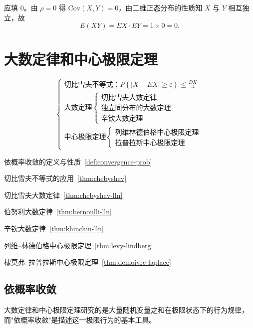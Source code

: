 \documentclass[lang=cn,11pt]{elegantbook}
\begin{document}
\begin{solution}
应填 0。由 \(\rho = 0\) 得 \(\mathrm{Cov}(X,Y) = 0\)，由二维正态分布的性质知 \(X\) 与 \(Y\) 相互独立，故
\[
E(XY) = EX \cdot EY = 1 \times 0 = 0.
\]
\end{solution}




\chapter{大数定律和中心极限定理}

\[
\begin{cases}
\text{切比雪夫不等式：} \displaystyle P\left\{|X - EX| \geqslant \varepsilon\right\} \leq \frac{DX}{\varepsilon^2} \\[6pt]
\text{大数定理}
\begin{cases}
\text{切比雪夫大数定律} \\
\text{独立同分布的大数定理} \\
\text{辛钦大数定理}
\end{cases} \\[6pt]
\text{中心极限定理}
\begin{cases}
\text{列维林德伯格中心极限定理} \\
\text{拉普拉斯中心极限定理}
\end{cases}
\end{cases}
\]

\begin{introduction}
    \item 依概率收敛的定义与性质~\ref{def:convergence-prob}
    \item 切比雪夫不等式的应用~\ref{thm:chebyshev}
    \item 切比雪夫大数定律~\ref{thm:chebyshev-lln}
    \item 伯努利大数定律~\ref{thm:bernoulli-lln}
    \item 辛钦大数定律~\ref{thm:khinchin-lln}
    \item 列维--林德伯格中心极限定理~\ref{thm:levy-lindberg}
    \item 棣莫弗--拉普拉斯中心极限定理~\ref{thm:demoivre-laplace}
\end{introduction}

\section{依概率收敛}

大数定律和中心极限定理研究的是大量随机变量之和在极限状态下的行为规律，而"依概率收敛"是描述这一极限行为的基本工具。
\end{document}
